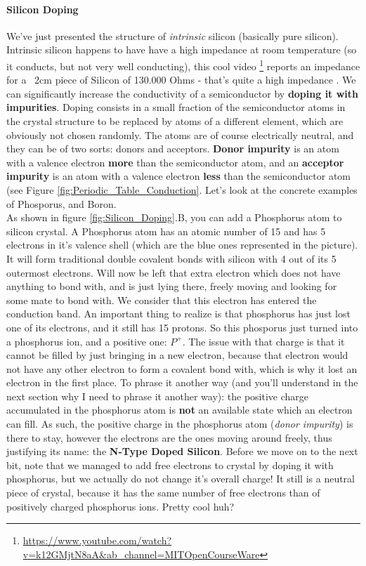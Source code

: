 \paragraph{Silicon Doping}

We've just presented the structure of \textit{intrinsic} silicon (basically pure silicon). Intrinsic silicon happens to have have a high impedance at room temperature (so it conducts, but not very well conducting), this cool video \footnote{\url{https://www.youtube.com/watch?v=k12GMjtN8aA&ab_channel=MITOpenCourseWare}} reports an impedance for a ~2cm piece of Silicon of 130.000 Ohms - that's quite a high impedance . We can significantly increase the conductivity of a semiconductor by \textbf{doping it with impurities}. Doping consists in a small fraction of the semiconductor atoms in the crystal structure to be replaced by atoms of a different element, which are obviously not chosen randomly. The atoms are of course electrically neutral, and they can be of two sorts: donors and acceptors. \textbf{Donor impurity} is an atom with a valence electron \textbf{more} than the semiconductor atom, and an \textbf{acceptor impurity} is an atom with a valence electron \textbf{less} than the semiconductor atom (see Figure \ref{fig:Periodic_Table_Conduction}. Let's look at the concrete examples of Phosporus, and Boron. \\

As shown in figure \ref{fig:Silicon_Doping}.B, you can add a Phosphorus atom to silicon crystal. A Phosphorus atom has an atomic number of 15 and has 5 electrons in it's valence shell (which are the blue ones represented in the picture). It will form traditional double covalent bonds with silicon with 4 out of its 5 outermost electrons. Will now be left that extra electron which does not have anything to bond with, and is just lying there, freely moving and looking for some mate to bond with. We consider that this electron has entered the conduction band. An important thing to realize is that phosphorus has just lost one of its electrons, and it still has 15 protons. So this phosporus just turned into a phosphorus ion, and a positive one: $P^+$. The issue with that charge is that it cannot be filled by just bringing in a new electron, because that electron would not have any other electron to form a covalent bond with, which is why it lost an electron in the first place. To phrase it another way (and you'll understand in the next section why I need to phrase it another way): the positive charge accumulated in the phosphorus atom is \textbf{not} an available state which an electron can fill. As such, the positive charge in the phosphorus atom (\textit{donor impurity}) is there to stay, however the electrons are the ones moving around freely, thus justifying its name: the \textbf{N-Type Doped Silicon}. Before we move on to the next bit, note that we managed to add free electrons to crystal by doping it with phosphorus, but we actually do not change it's overall charge! It still is a neutral piece of crystal, because it has the same number of free electrons than of positively charged phosphorus ions. Pretty cool huh? \\

